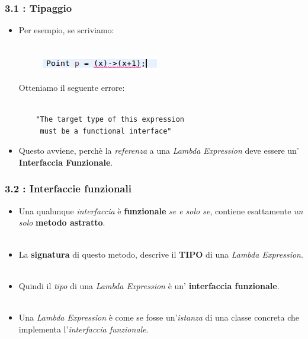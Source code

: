 \documentclass{beamer}
\begin{document}
\begin{frame}[fragile]
	\frametitle{\textbf{3.1 : Tipaggio}}
	\begin{itemize}
		\item 
			Per esempio, se scriviamo:\\\
			\begin{figure}
				\centering
				\includegraphics[width=0.3\linewidth]{image/target.png}
				\label{fig:target}
			\end{figure}
			Otteniamo il seguente errore:\\\
\begin{lstlisting}
	"The target type of this expression
	 must be a functional interface"
\end{lstlisting}
		\item 
			Questo avviene, perchè la \textit{referenza} a una \textit{Lambda Expression} deve essere un' \textbf{Interfaccia Funzionale}.
	\end{itemize}
\end{frame}


\begin{frame}
	\frametitle{\textbf{3.2 : Interfaccie funzionali}}
	\begin{itemize}
		\item
			Una qualunque \textit{interfaccia} è \textbf{funzionale} \textit{se e solo se}, contiene esattamente \textit{un solo} \textbf{metodo astratto}.\\\
		\item 
			La \textbf{signatura} di questo metodo, descrive il \textbf{TIPO} di una \textit{Lambda Expression}.\\\
		\item 
			Quindi il \textit{tipo} di una \textit{Lambda Expression} è un' \textbf{interfaccia funzionale}.\\\
		\item 
			Una \textit{Lambda Expression} è come se fosse un'\textit{istanza} di una classe concreta che implementa l'\textit{interfaccia funzionale}.
	\end{itemize}
\end{frame}

\end{document}
